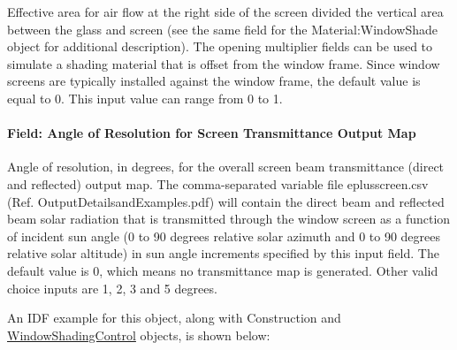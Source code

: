 Effective area for air flow at the right side of the screen divided the vertical area between the glass and screen (see the same field for the Material:WindowShade object for additional description). The opening multiplier fields can be used to simulate a shading material that is offset from the window frame. Since window screens are typically installed against the window frame, the default value is equal to 0. This input value can range from 0 to 1.

\paragraph{Field: Angle of Resolution for Screen Transmittance Output Map}\label{field-angle-of-resolution-for-screen-transmittance-output-map}

Angle of resolution, in degrees, for the overall screen beam transmittance (direct and reflected) output map. The comma-separated variable file eplusscreen.csv (Ref. OutputDetailsandExamples.pdf) will contain the direct beam and reflected beam solar radiation that is transmitted through the window screen as a function of incident sun angle (0 to 90 degrees relative solar azimuth and 0 to 90 degrees relative solar altitude) in sun angle increments specified by this input field. The default value is 0, which means no transmittance map is generated. Other valid choice inputs are 1, 2, 3 and 5 degrees.

An IDF example for this object, along with Construction and \hyperref[windowpropertyshadingcontrol]{WindowShadingControl} objects, is shown below:

